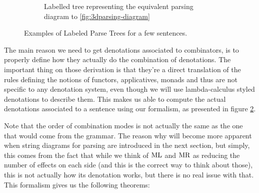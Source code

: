 \begin{figure}
	\begin{subfigure}{.45\textwidth}
		\centering
		\caption{Labelled tree representing the equivalent parsing diagram to
			\ref{fig:3dparsing-diagram}}
		\label{fig:tree-rain}
	\end{subfigure}
	\caption{Examples of Labeled Parse Trees for a few sentences.}
	\label{fig:parsing-trees}
\end{figure}

The main reason we need to get denotations associated to combinators, is to
properly define how they actually do the combination of denotations.
The important thing on those derivation is that they're a direct translation
of the rules defining the notions of functors, applicatives, monads and thus
are not specific to any denotation system, even though we will use
lambda-calculus styled denotations to describe them.
This makes us able to compute the actual denotations associated to a sentence
using our formalism, as presented in figure \ref{fig:parsing-trees}.

Note that the order of combination modes is not actually the same as the one
that would come from the grammar.
The reason why will become more apparent when string diagrams for parsing are
introduced in the next section, but simply, this comes from the fact that while
we think of $\text{ML}$ and $\text{MR}$ as reducing the number of effects on each
side (and this is the correct way to think about those), this is not actually
how its denotation works, but there is no real issue with that.
This formalism gives us the following theorems:

